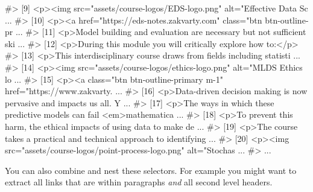 \documentclass[
  letterpaper,
  DIV=11,
  numbers=noendperiod]{scrreprt}
\newenvironment{Shaded}{\begin{snugshade}}{\end{snugshade}}
\newcommand{\CommentTok}[1]{\textcolor[rgb]{0.37,0.37,0.37}{#1}}
\begin{document}
\begin{Shaded}
\begin{Highlighting}[]
\CommentTok{\#\textgreater{}  [9] \textless{}p\textgreater{}\textless{}img src="assets/course{-}logos/EDS{-}logo.png" alt="Effective Data Sc ...}
\CommentTok{\#\textgreater{} [10] \textless{}p\textgreater{}\textless{}a href="https://eds{-}notes.zakvarty.com" class="btn btn{-}outline{-}pr ...}
\CommentTok{\#\textgreater{} [11] \textless{}p\textgreater{}Model building and evaluation are necessary but not sufficient ski ...}
\CommentTok{\#\textgreater{} [12] \textless{}p\textgreater{}During this module you will critically explore how to:\textless{}/p\textgreater{}}
\CommentTok{\#\textgreater{} [13] \textless{}p\textgreater{}This interdisciplinary course draws from fields including statisti ...}
\CommentTok{\#\textgreater{} [14] \textless{}p\textgreater{}\textless{}img src="assets/course{-}logos/ethics{-}logo.png" alt="MLDS Ethics lo ...}
\CommentTok{\#\textgreater{} [15] \textless{}p\textgreater{}\textless{}a class="btn btn{-}outline{-}primary m{-}1" href="https://www.zakvarty. ...}
\CommentTok{\#\textgreater{} [16] \textless{}p\textgreater{}Data{-}driven decision making is now pervasive and impacts us all. Y ...}
\CommentTok{\#\textgreater{} [17] \textless{}p\textgreater{}The ways in which these predictive models can fail \textless{}em\textgreater{}mathematica ...}
\CommentTok{\#\textgreater{} [18] \textless{}p\textgreater{}To prevent this harm, the ethical impacts of using data to make de ...}
\CommentTok{\#\textgreater{} [19] \textless{}p\textgreater{}The course takes a practical and technical approach to identifying ...}
\CommentTok{\#\textgreater{} [20] \textless{}p\textgreater{}\textless{}img src="assets/course{-}logos/point{-}process{-}logo.png" alt="Stochas ...}
\CommentTok{\#\textgreater{} ...}
\end{Highlighting}
\end{Shaded}

You can also combine and nest these selectors. For example you might
want to extract all links that are within paragraphs \emph{and} all
second level headers.
\end{document}
